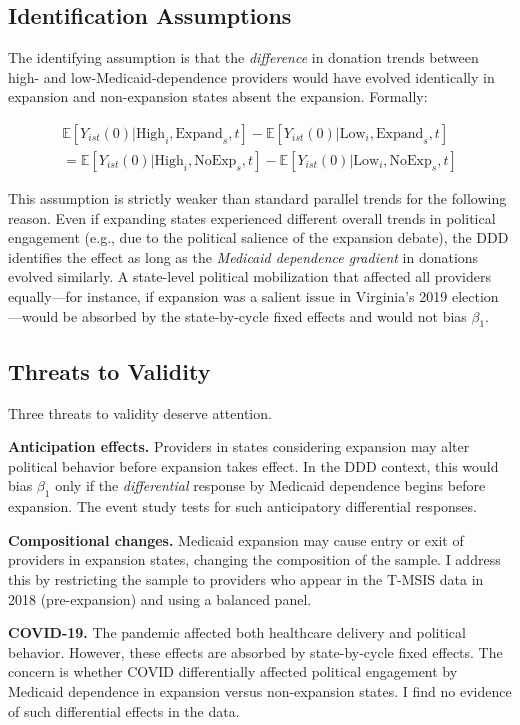 \documentclass[12pt]{article}
\newcommand{\E}{\mathbb{E}}
\begin{document}
\subsection{Identification Assumptions}

The identifying assumption is that the \textit{difference} in donation trends between high- and low-Medicaid-dependence providers would have evolved identically in expansion and non-expansion states absent the expansion. Formally:

\begin{multline}
    \E[Y_{ist}(0) | \text{High}_i, \text{Expand}_s, t] - \E[Y_{ist}(0) | \text{Low}_i, \text{Expand}_s, t] \\
    = \E[Y_{ist}(0) | \text{High}_i, \text{NoExp}_s, t] - \E[Y_{ist}(0) | \text{Low}_i, \text{NoExp}_s, t]
\end{multline}

This assumption is strictly weaker than standard parallel trends for the following reason. Even if expanding states experienced different overall trends in political engagement (e.g., due to the political salience of the expansion debate), the DDD identifies the effect as long as the \textit{Medicaid dependence gradient} in donations evolved similarly. A state-level political mobilization that affected all providers equally---for instance, if expansion was a salient issue in Virginia's 2019 election---would be absorbed by the state-by-cycle fixed effects and would not bias $\beta_1$.

\subsection{Threats to Validity}

Three threats to validity deserve attention.

\textbf{Anticipation effects.} Providers in states considering expansion may alter political behavior before expansion takes effect. In the DDD context, this would bias $\beta_1$ only if the \textit{differential} response by Medicaid dependence begins before expansion. The event study tests for such anticipatory differential responses.

\textbf{Compositional changes.} Medicaid expansion may cause entry or exit of providers in expansion states, changing the composition of the sample. I address this by restricting the sample to providers who appear in the T-MSIS data in 2018 (pre-expansion) and using a balanced panel.

\textbf{COVID-19.} The pandemic affected both healthcare delivery and political behavior. However, these effects are absorbed by state-by-cycle fixed effects. The concern is whether COVID differentially affected political engagement by Medicaid dependence in expansion versus non-expansion states. I find no evidence of such differential effects in the data.
\end{document}
